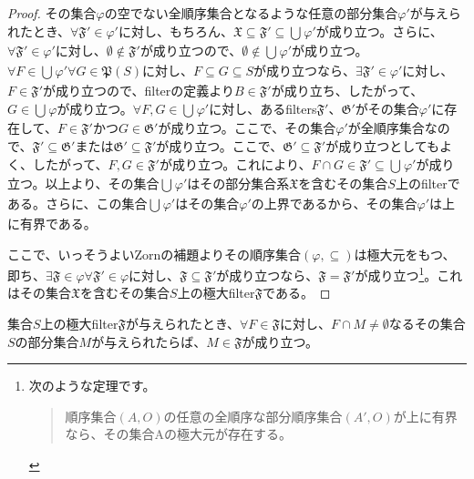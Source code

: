 \documentclass[dvipdfmx]{jsarticle}
\begin{document}
\begin{proof}
その集合$\varphi$の空でない全順序集合となるような任意の部分集合$\varphi'$が与えられたとき、$\forall\mathfrak{F}' \in \varphi'$に対し、もちろん、$\mathfrak{X \subseteq}\mathfrak{F}' \subseteq \bigcup_{} \varphi'$が成り立つ。さらに、$\forall\mathfrak{F}' \in \varphi'$に対し、$\emptyset \notin \mathfrak{F}'$が成り立つので、$\emptyset \notin \bigcup_{} \varphi'$が成り立つ。$\forall F \in \bigcup_{} \varphi'\forall G \in \mathfrak{P}(S)$に対し、$F \subseteq G \subseteq S$が成り立つなら、$\exists\mathfrak{F}' \in \varphi'$に対し、$F \in \mathfrak{F}'$が成り立つので、filterの定義より$B \in \mathfrak{F}'$が成り立ち、したがって、$G \in \bigcup_{} \varphi$が成り立つ。$\forall F,G \in \bigcup_{} \varphi'$に対し、あるfilters$\mathfrak{F}'$、$\mathfrak{G}'$がその集合$\varphi'$に存在して、$F \in \mathfrak{F}'$かつ$G \in \mathfrak{G}'$が成り立つ。ここで、その集合$\varphi'$が全順序集合なので、$\mathfrak{F}' \subseteq \mathfrak{G}'$または$\mathfrak{G}' \subseteq \mathfrak{F}'$が成り立つ。ここで、$\mathfrak{G}' \subseteq \mathfrak{F}'$が成り立つとしてもよく、したがって、$F,G \in \mathfrak{F}'$が成り立つ。これにより、$F \cap G \in \mathfrak{F}' \subseteq \bigcup_{} \varphi'$が成り立つ。以上より、その集合$\bigcup_{} \varphi'$はその部分集合系$\mathfrak{X}$を含むその集合$S$上のfilterである。さらに、この集合$\bigcup_{} \varphi'$はその集合$\varphi'$の上界であるから、その集合$\varphi'$は上に有界である。\par
ここで、いっそうよいZornの補題よりその順序集合$(\varphi, \subseteq )$は極大元をもつ、即ち、$\mathfrak{\exists F \in}\varphi\forall\mathfrak{F}' \in \varphi$に対し、$\mathfrak{F \subseteq}\mathfrak{F}'$が成り立つなら、$\mathfrak{F} = \mathfrak{F}'$が成り立つ\footnote{次のような定理です。
\begin{quote}
  順序集合$(A,O)$の任意の全順序な部分順序集合$\left( A',O \right)$が上に有界なら、その集合Aの極大元が存在する。
\end{quote}}。これはその集合$\mathfrak{X}$を含むその集合$S$上の極大filter$\mathfrak{F}$である。
\end{proof}
\begin{thm}\label{8.1.8.7}
集合$S$上の極大filter$\mathfrak{F}$が与えられたとき、$\forall F\in \mathfrak{F}$に対し、$F \cap M \neq \emptyset$なるその集合$S$の部分集合$M$が与えられたらば、$M \in \mathfrak{F}$が成り立つ。
\end{thm}
\end{document}
